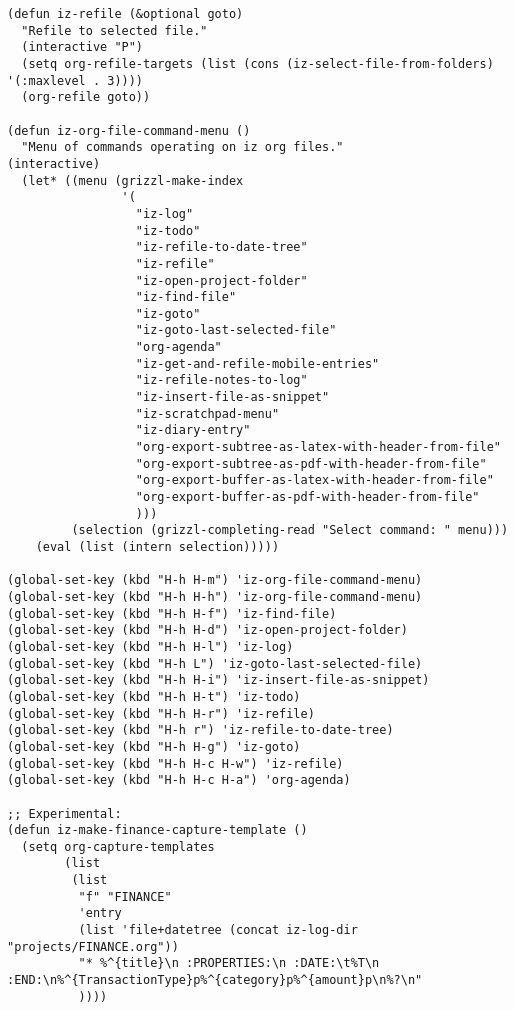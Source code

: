 \documentclass{article}
\begin{document}
\begin{verbatim}
(defun iz-refile (&optional goto)
  "Refile to selected file."
  (interactive "P")
  (setq org-refile-targets (list (cons (iz-select-file-from-folders) '(:maxlevel . 3))))
  (org-refile goto))

(defun iz-org-file-command-menu ()
  "Menu of commands operating on iz org files."
(interactive)
  (let* ((menu (grizzl-make-index
                '(
                  "iz-log"
                  "iz-todo"
                  "iz-refile-to-date-tree"
                  "iz-refile"
                  "iz-open-project-folder"
                  "iz-find-file"
                  "iz-goto"
                  "iz-goto-last-selected-file"
                  "org-agenda"
                  "iz-get-and-refile-mobile-entries"
                  "iz-refile-notes-to-log"
                  "iz-insert-file-as-snippet"
                  "iz-scratchpad-menu"
                  "iz-diary-entry"
                  "org-export-subtree-as-latex-with-header-from-file"
                  "org-export-subtree-as-pdf-with-header-from-file"
                  "org-export-buffer-as-latex-with-header-from-file"
                  "org-export-buffer-as-pdf-with-header-from-file"
                  )))
         (selection (grizzl-completing-read "Select command: " menu)))
    (eval (list (intern selection)))))

(global-set-key (kbd "H-h H-m") 'iz-org-file-command-menu)
(global-set-key (kbd "H-h H-h") 'iz-org-file-command-menu)
(global-set-key (kbd "H-h H-f") 'iz-find-file)
(global-set-key (kbd "H-h H-d") 'iz-open-project-folder)
(global-set-key (kbd "H-h H-l") 'iz-log)
(global-set-key (kbd "H-h L") 'iz-goto-last-selected-file)
(global-set-key (kbd "H-h H-i") 'iz-insert-file-as-snippet)
(global-set-key (kbd "H-h H-t") 'iz-todo)
(global-set-key (kbd "H-h H-r") 'iz-refile)
(global-set-key (kbd "H-h r") 'iz-refile-to-date-tree)
(global-set-key (kbd "H-h H-g") 'iz-goto)
(global-set-key (kbd "H-h H-c H-w") 'iz-refile)
(global-set-key (kbd "H-h H-c H-a") 'org-agenda)

;; Experimental:
(defun iz-make-finance-capture-template ()
  (setq org-capture-templates
        (list
         (list
          "f" "FINANCE"
          'entry
          (list 'file+datetree (concat iz-log-dir "projects/FINANCE.org"))
          "* %^{title}\n :PROPERTIES:\n :DATE:\t%T\n :END:\n%^{TransactionType}p%^{category}p%^{amount}p\n%?\n"
          ))))
\end{verbatim}
\end{document}

